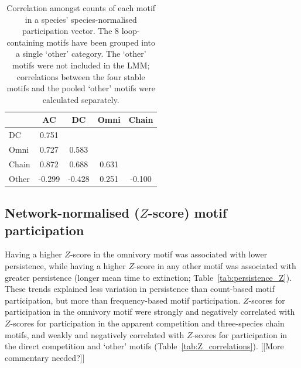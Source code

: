 \documentclass[12pt]{article}
\begin{document}
\begin{spacing}{2.0}
		\begin{table}[h!]
		\caption{Correlation amongst counts of each motif in a species' species-normalised participation vector. The 8 loop-containing motifs have been grouped into a single `other' category. The `other' motifs were not included in the LMM; correlations between the four stable motifs and the pooled `other' motifs were calculated separately.}
		\label{tab:freq_correlations}
		\begin{tabular}{l | c c c c}
			& AC & DC & Omni & Chain \\
		\hline
		DC    &  0.751 &       & & \\         
		Omni  &  0.727 &  0.583 &   & \\   
		Chain &  0.872 &  0.688 & 0.631 & \\
		Other & -0.299 & -0.428 & 0.251 & -0.100 \\
		\hline
		\end{tabular}
		\end{table}


	\subsection*{Network-normalised ($Z$-score) motif participation}

		Having a higher $Z$-score in the omnivory motif was associated with lower persistence, while having a higher $Z$-score in any other motif was associated with greater persistence (longer mean time to extinction; Table~\ref{tab:persistence_Z}).
		These trends explained less variation in persistence than count-based motif participation, but more than frequency-based motif participation.
		$Z$-scores for participation in the omnivory motif were strongly and negatively correlated with $Z$-scores for participation in the apparent competition and three-species chain motifs, and weakly and negatively correlated with $Z$-scores for participation in the direct competition and `other' motifs (Table~\ref{tab:Z_correlations}).
		[[More commentary needed?]]



\end{spacing}
\end{document}
